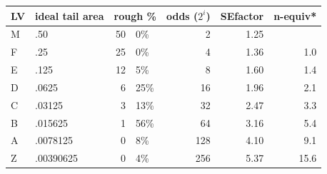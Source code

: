\documentclass[12pt,oneside]{article}
\begin{document}
\begin{table}[htpb]
  \centering
  \begin{tabular}{llr@{.}lrrr}
  \toprule
  LV & ideal tail area & \multicolumn{2}{l}{rough \%} & odds ($2^i$) & SEfactor & n-equiv*  \\
  \midrule
   M & .50 & 50 & 0\% & 2 & 1.25%
   & \\
   F & .25 & 25 & 0\% & 4 & 1.36 & 1.0\\
   E & .125 & 12 & 5\% & 8 & 1.60 & 1.4\\
   D & .0625 & 6 & 25\% & 16 & 1.96 & 2.1\\
   C & .03125 & 3 & 13\% & 32 & 2.47 & 3.3\\
   B & .015625 & 1 & 56\% & 64 & 3.16 & 5.4\\
   A & .0078125 & 0 & 8\% & 128 & 4.10 & 9.1\\
   Z & .00390625 & 0 & 4\% & 256 & 5.37 & 15.6\\
  \bottomrule
  \end{tabular}


\end{table}
\end{document}
